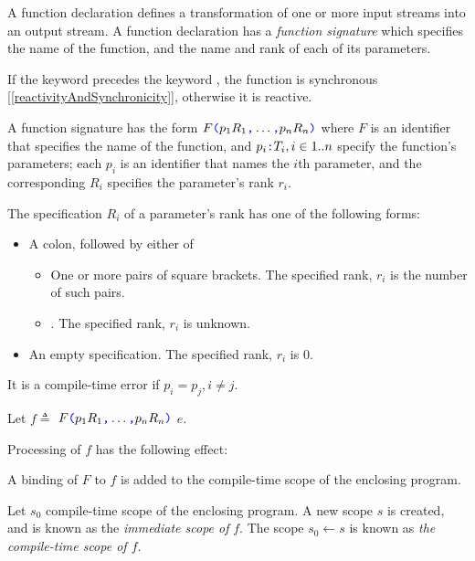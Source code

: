 \documentclass{article}
\begin{document}
\FunctionDeclaration

A function declaration defines a transformation of one or more input streams into an output stream. A function declaration has a
{\em function signature} which specifies the name of the function, and the name and rank of each of its parameters.

If the keyword \SYNC precedes the keyword \FUNC, the function is synchronous [\ref{reactivityAndSynchronicity}], otherwise it is reactive.

\FunctionSignature{}

\ParameterList{}

\Parameter{}

\RankSigSuffix{}

\RankSig{}

A function signature has the form  $F\texttt{\color{blue} (}{}p_1 R_1\texttt{\color{blue} ,}{} \ldots\texttt{\color{blue} ,}{} p_n R_n\texttt{\color{blue} )}{}$ where $F$ is an identifier that specifies the name of the function, and $p_i\texttt{\color{blue} :}{} T_i, i \in 1..n$ specify the function's parameters; each $p_i$ is an identifier that names the $i$th parameter, and the corresponding $R_i$ specifies the parameter's rank $r_i$.  

The specification $R_i$ of a parameter's rank has one of the following forms:
\begin{itemize}
\item A colon, followed by either of 
\begin{itemize}
\item One or more pairs of square brackets. The specified rank, $r_i$ is the number of such pairs.
\item \QUESTIONMARK{}.  The specified rank, $r_i$ is unknown.
\end{itemize}
\item An empty specification. The specified rank, $r_i$ is 0.
\end{itemize}

It is a compile-time error if $p_i = p_j, i \ne j$.

Let $f \triangleq$ \FUNC{} $F\texttt{\color{blue} (}{}p_1 R_1\texttt{\color{blue} ,}{} \ldots\texttt{\color{blue} ,}{} p_n R_n\texttt{\color{blue} )}{}$  \BIND{} $e$.

Processing of $f$  has the following effect:

A binding of $F$ to $f$ is added to the compile-time scope of the enclosing program.

 Let $s_0$ compile-time scope of the enclosing program.
A new scope $s$ is created, and is known as the {\em immediate scope of} $f$. The scope $s_0 \leftarrow s$ is known as {\em the compile-time scope of $f$}.
\end{document}
